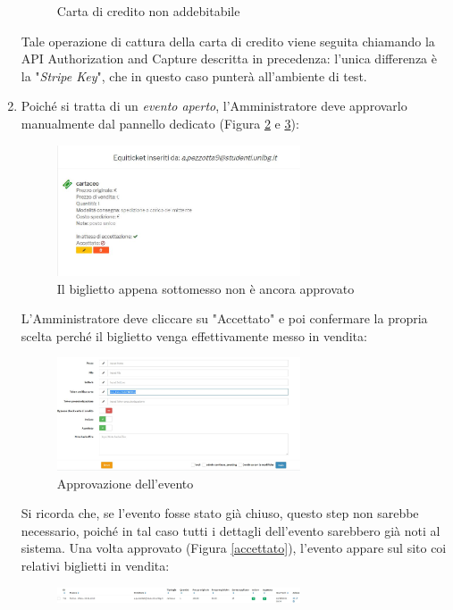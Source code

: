 \begin{enumerate}
\begin{figure}[htbp]
	\caption{Carta di credito non addebitabile}
	\label{testvoid}
\end{figure}
Tale operazione di cattura della carta di credito viene seguita chiamando la API Authorization and Capture descritta in precedenza: l'unica differenza è la "\emph{Stripe Key}", che in questo caso punterà all'ambiente di test.
\item Poiché si tratta di un \textit{evento aperto}, l'Amministratore deve approvarlo manualmente dal pannello dedicato (Figura \ref{testappr1} e \ref{testappr2}):
\begin{figure}[htbp]
	\centering
	\includegraphics[width=0.68\textwidth]{chapter4/immagini/test_approvazione}
	\caption{Il biglietto appena sottomesso non è ancora approvato}
	\label{testappr1}
\end{figure}
L'Amministratore deve cliccare su "Accettato" e poi confermare la propria scelta perché il biglietto venga effettivamente messo in vendita: 
\begin{figure}[htbp]
	\centering
	\includegraphics[width=0.68\textwidth]{chapter4/immagini/test_admin2}
	\caption{Approvazione dell'evento}
	\label{testappr2}
\end{figure}
Si ricorda che, se l'evento fosse stato già chiuso, questo step non sarebbe necessario, poiché in tal caso tutti i dettagli dell'evento sarebbero già noti al sistema. 
Una volta approvato (Figura \ref{accettato}), l'evento appare sul sito coi relativi biglietti in vendita: 
\begin{figure}[htbp]
	\centering
	\includegraphics[width=0.68\textwidth]{chapter4/immagini/test_accettato}

\end{figure}
\end{enumerate}
